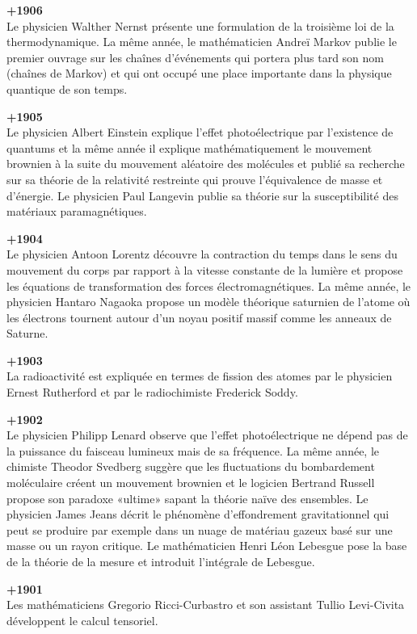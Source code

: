 \textbf{+1906}\\
Le physicien Walther Nernst présente une formulation de la troisième loi de la thermodynamique. La même année, le mathématicien Andreï Markov publie le premier ouvrage sur les chaînes d'événements qui portera plus tard son nom (chaînes de Markov) et qui ont occupé une place importante dans la physique quantique de son temps.

\textbf{+1905}\\
Le physicien Albert Einstein explique l'effet photoélectrique par l'existence de quantums et la même année il explique mathématiquement le mouvement brownien à la suite du mouvement aléatoire des molécules et publié sa recherche sur sa théorie de la relativité restreinte qui prouve l'équivalence de masse et d'énergie. Le physicien Paul Langevin publie sa théorie sur la susceptibilité des matériaux paramagnétiques.

\textbf{+1904}\\
Le physicien Antoon Lorentz découvre la contraction du temps dans le sens du mouvement du corps par rapport à la vitesse constante de la lumière et propose les équations de transformation des forces électromagnétiques. La même année, le physicien Hantaro Nagaoka propose un modèle théorique saturnien de l'atome où les électrons tournent autour d'un noyau positif massif comme les anneaux de Saturne.

\textbf{+1903}\\
La radioactivité est expliquée en termes de fission des atomes par le physicien Ernest Rutherford et par le radiochimiste Frederick Soddy.

\textbf{+1902}\\
Le physicien Philipp Lenard observe que l'effet photoélectrique ne dépend pas de la puissance du faisceau lumineux mais de sa fréquence. La même année, le chimiste Theodor Svedberg suggère que les fluctuations du bombardement moléculaire créent un mouvement brownien et le logicien Bertrand Russell propose son paradoxe «ultime» sapant la théorie naïve des ensembles. Le physicien James Jeans décrit le phénomène d'effondrement gravitationnel qui peut se produire par exemple dans un nuage de matériau gazeux basé sur une masse ou un rayon critique. Le mathématicien Henri Léon Lebesgue pose la base de la théorie de la mesure et introduit l'intégrale de Lebesgue.

\textbf{+1901}\\
Les mathématiciens Gregorio Ricci-Curbastro et son assistant Tullio Levi-Civita développent le calcul tensoriel.

